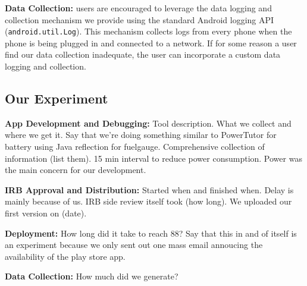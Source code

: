 {\bf Data Collection:} \PhoneLab{} users are encouraged to leverage the data
logging and collection mechanism we provide using the standard Android logging
API (\texttt{android.util.Log}). This mechanism collects logs from every phone
when the phone is being plugged in and connected to a network. If for some
reason a \PhoneLab{} user find our data collection inadequate, the user can
incorporate a custom data logging and collection.

\subsection{Our Experiment}

{\bf App Development and Debugging:} Tool description. What we collect and where
we get it. Say that we're doing something similar to PowerTutor for battery
using Java reflection for fuelgauge. Comprehensive collection of information
(list them). 15 min interval to reduce power consumption. Power was the main
concern for our development.

{\bf IRB Approval and Distribution:} Started when and finished when. Delay is
mainly because of us. IRB side review itself took (how long). We uploaded our
first version on (date).

{\bf Deployment:} How long did it take to reach 88? Say that this in and of
itself is an experiment because we only sent out one mass email annoucing the
availability of the play store app.

{\bf Data Collection:} How much did we generate?
